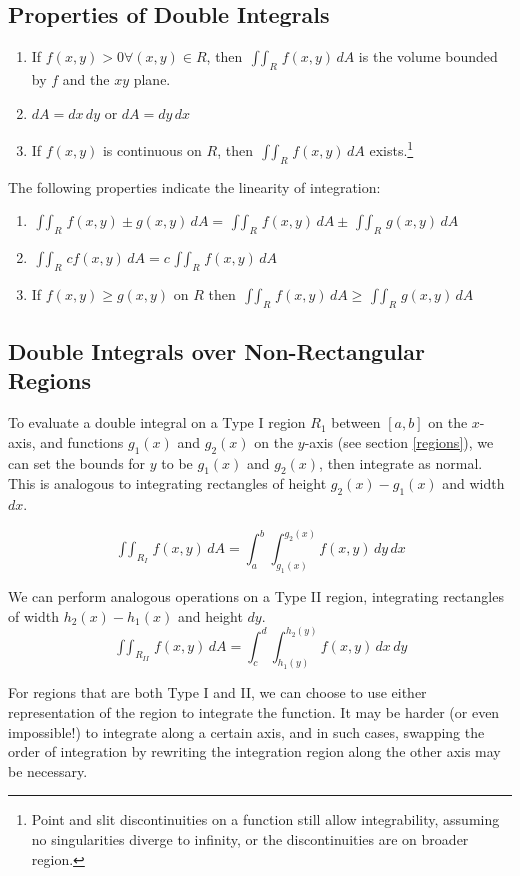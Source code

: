 \documentclass{article}
\begin{document}
\subsection{Properties of Double Integrals}
\begin{enumerate}
    \item If $f(x,y)>0 \forall(x,y)\in{R}$, then $\mathop{\int\int}_Rf(x,y)\,dA$ is the volume bounded by $f$ and the $xy$ plane.
    \item $dA=dx\,dy$ or $dA=dy\,dx$
    \item If $f(x,y)$ is continuous on $R$, then $\mathop{\int\int}_R f(x,y)\,dA$ exists.\footnote{Point and slit discontinuities on a function still allow integrability, assuming no singularities diverge to infinity, or the discontinuities are on broader region.}
\end{enumerate}
The following properties indicate the linearity of integration:
\begin{enumerate}
    \item $\mathop{\int\int}_Rf(x,y)\pm g(x,y)\,dA=\mathop{\int\int}_R f(x,y)\,dA\pm\mathop{\int\int}_R g(x,y)\,dA$
    \item $\mathop{\int\int}_Rcf(x,y)\,dA=c\mathop{\int\int}_R f(x,y)\,dA$
    \item If $f(x,y)\ge g(x,y)$ on $R$ then $\mathop{\int\int}_R f(x,y)\,dA\ge\mathop{\int\int}_R g(x,y)\,dA$
\end{enumerate}

\subsection{Double Integrals over Non-Rectangular Regions}
To evaluate a double integral on a Type I region $R_1$ between $[a,b]$ on the $x$-axis, and functions $g_1(x)$ and $g_2(x)$ on the $y$-axis (see section \ref{regions}), we can set the bounds for $y$ to be $g_1(x)$ and $g_2(x)$, then integrate as normal. This is analogous to integrating rectangles of height $g_2(x)-g_1(x)$ and width $dx$.

$$\mathop{\int\int}_{R_I} f(x,y)\,dA=\int^b_a\int^{g_2(x)}_{g_1(x)}f(x,y)\,dy\,dx$$

We can perform analogous operations on a Type II region, integrating rectangles of width $h_2(x)-h_1(x)$ and height $dy$.
$$\mathop{\int\int}_{R_{II}} f(x,y)\,dA=\int^d_c\int^{h_2(y)}_{h_1(y)}f(x,y)\,dx\,dy$$

For regions that are both Type I and II, we can choose to use either representation of the region to integrate the function. It may be harder (or even impossible!) to integrate along a certain axis, and in such cases, swapping the order of integration by rewriting the integration region along the other axis may be necessary.
\end{document}
